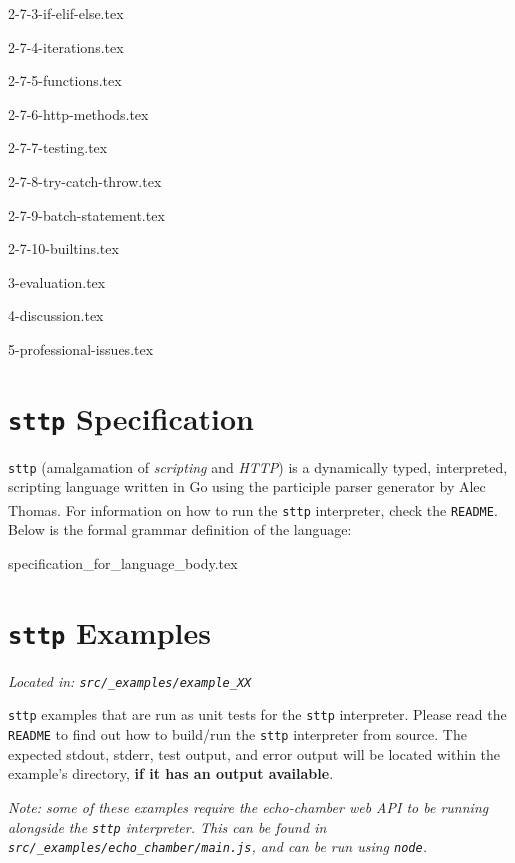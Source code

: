 \documentclass[]{full}
\theoremstyle{definition}
\begin{document}
{2-7-3-if-elif-else.tex}

{2-7-4-iterations.tex}

{2-7-5-functions.tex}

{2-7-6-http-methods.tex}

{2-7-7-testing.tex}

{2-7-8-try-catch-throw.tex}

{2-7-9-batch-statement.tex}

{2-7-10-builtins.tex}

{3-evaluation.tex}

{4-discussion.tex}

{5-professional-issues.tex}


\appendix

\cprotect\chapter{\verb|sttp| Specification}
\label{appendix:sttp-specification}

\verb|sttp| (amalgamation of \textit{scripting} and \textit{HTTP}) is a dynamically typed, interpreted, scripting language written in Go using the participle parser generator by Alec Thomas\textsuperscript{\cite{thomas_2021}}. For information on how to run the \verb|sttp| interpreter, check the \verb|README|. Below is the formal grammar definition of the language:

{specification_for_language_body.tex}

\cprotect\chapter{\verb|sttp| Examples}
\label{appendix:sttp-examples}

\cprotect\textit{Located in: \verb|src/_examples/example_XX|}

\verb|sttp| examples that are run as unit tests for the \verb|sttp| interpreter. Please read the \verb|README| to find out how to build/run the \verb|sttp| interpreter from source. The expected stdout, stderr, test output, and error output will be located within the example's directory, \textbf{if it has an output available}.

\cprotect\textit{Note: some of these examples require the echo-chamber web API to be running alongside the \verb|sttp| interpreter. This can be found in \verb|src/_examples/echo_chamber/main.js|, and can be run using \verb|node|.}
\end{document}
